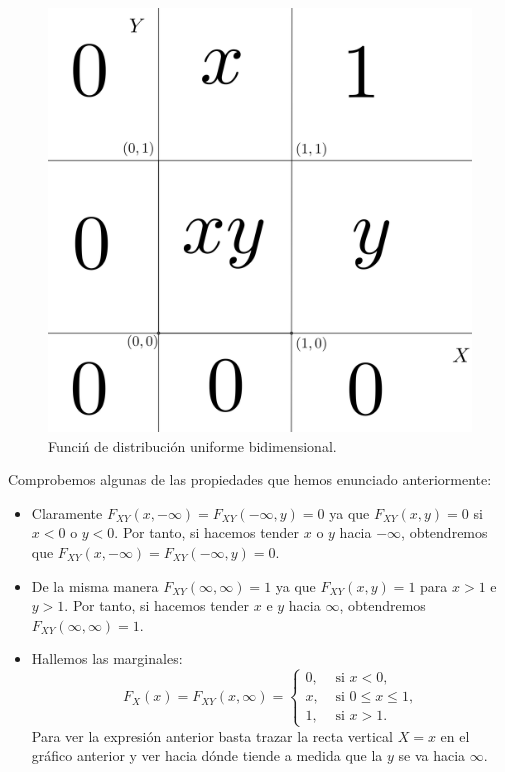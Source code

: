 \documentclass[]{book}
\begin{document}
\begin{figure}
\centering
\includegraphics{Images/FxyEx.png}
\caption{\label{fig:bid7}Funciń de distribución uniforme bidimensional.}
\end{figure}

Comprobemos algunas de las propiedades que hemos enunciado anteriormente:

\begin{itemize}
\item
  Claramente \(F_{XY}(x,-\infty)=F_{XY}(-\infty,y)=0\) ya que \(F_{XY}(x,y)=0\) si \(x<0\) o \(y<0\). Por tanto, si hacemos tender \(x\) o \(y\) hacia \(-\infty\), obtendremos que \(F_{XY}(x,-\infty)=F_{XY}(-\infty,y)=0\).
\item
  De la misma manera \(F_{XY}(\infty,\infty)=1\) ya que \(F_{XY}(x,y)=1\) para \(x>1\) e \(y>1\). Por tanto, si hacemos tender \(x\) e \(y\) hacia \(\infty\), obtendremos \(F_{XY}(\infty,\infty)=1\).
\item
  Hallemos las marginales:
  \[
  F_X(x)=F_{XY}(x,\infty)=\begin{cases}
  0, & \mbox{ si }x<0,\\
  x, & \mbox{ si } 0\leq x\leq 1,\\
  1, & \mbox{ si } x>1.
  \end{cases}
  \]
  Para ver la expresión anterior basta trazar la recta vertical \(X=x\) en el gráfico anterior y ver hacia dónde tiende a medida que la \(y\) se va hacia \(\infty\).
\end{itemize}
\end{document}
